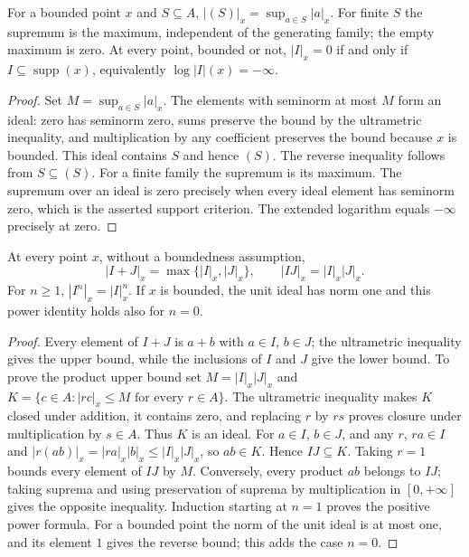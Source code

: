 \begin{lemma}
\label{lem:general-ideal-norm-generators}
\leanok
{}
For a bounded point $x$ and $S\subseteq A$,
$|(S)|_x=\sup_{a\in S}|a|_x$. For finite $S$ the supremum is the maximum,
independent of the generating family; the empty maximum is zero.
At every point, bounded or not, $|I|_x=0$ if and only if
$I\subseteq\operatorname{supp}(x)$, equivalently $\log|I|(x)=-\infty$.
\end{lemma}
\begin{proof}
Set $M=\sup_{a\in S}|a|_x$. The elements with seminorm at most $M$
form an ideal: zero has seminorm zero, sums preserve the bound by the
ultrametric inequality, and multiplication by any coefficient preserves the
bound because $x$ is bounded. This ideal contains $S$ and hence $(S)$.
The reverse inequality follows from $S\subseteq(S)$. For a finite family
the supremum is its maximum. The supremum over an ideal is zero precisely
when every ideal element has seminorm zero, which is the asserted support
criterion. The extended logarithm equals $-\infty$ precisely at zero.
\end{proof}

\begin{lemma}
\label{lem:general-ideal-norm-arithmetic}
\leanok
{}
At every point $x$, without a boundedness assumption,
\[
 |I+J|_x=\max\{|I|_x,|J|_x\},\qquad |IJ|_x=|I|_x|J|_x.
\]
For $n\ge1$, $|I^n|_x=|I|_x^n$. If $x$ is bounded, the unit ideal
has norm one and this power identity holds also for $n=0$.
\end{lemma}
\begin{proof}
Every element of $I+J$ is $a+b$ with $a\in I$, $b\in J$; the
ultrametric inequality gives the upper bound, while the inclusions of
$I$ and $J$ give the lower bound. To prove the product upper bound set
$M=|I|_x|J|_x$ and
$K=\{c\in A: |rc|_x\le M\text{ for every }r\in A\}$.
The ultrametric inequality makes $K$ closed under addition, it contains
zero, and replacing $r$ by $rs$ proves closure under multiplication by
$s\in A$. Thus $K$ is an ideal. For $a\in I$, $b\in J$, and any $r$,
$ra\in I$ and
$|r(ab)|_x=|ra|_x|b|_x\le |I|_x|J|_x$, so $ab\in K$.
Hence $IJ\subseteq K$. Taking $r=1$ bounds every element of $IJ$ by
$M$. Conversely, every product $ab$ belongs to $IJ$; taking suprema
and using preservation of suprema by multiplication in $[0,+\infty]$
gives the opposite inequality. Induction starting at $n=1$ proves the
positive power formula. For a bounded point the norm of the unit ideal
is at most one, and its element $1$ gives the reverse bound; this adds
the case $n=0$.
\end{proof}

